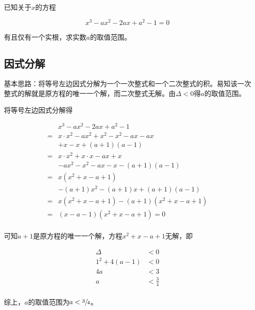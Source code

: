 

已知关于$x$的方程

\[ x^3 - ax^2 - 2ax + a^2 - 1 = 0 \]

有且仅有一个实根，求实数$a$的取值范围。


\subsection{因式分解}

基本思路：将等号左边因式分解为一个一次整式和一个二次整式的积。易知该一次整式的解就是原方程的唯一一个解，而二次整式无解。由$\Delta < 0$得$a$的取值范围。

将等号左边因式分解得

\begin{align*}
  & x^3 - ax^2 - 2ax + a^2 - 1 \\
  =&{} x\cdot x^2 - ax^2 + x^2 - x^2 - ax - ax \\
  &+ x - x + (a + 1)(a - 1) \\
  =&{} x\cdot x^2 + x\cdot x - ax + x \\
  &- ax^2 - x^2 - ax - x - (a + 1)(a - 1) \\
  =&{} x(x^2 + x - a + 1) \\
  &- (a + 1)x^2 - (a + 1)x + (a + 1)(a - 1) \\
  =&{} x(x^2 + x - a + 1) - (a + 1)(x^2 + x - a + 1) \\
  =&{} (x - a - 1)(x^2 + x - a + 1) = 0 \\
\end{align*}

可知$a + 1$是原方程的唯一一个解，方程$x^2 + x - a + 1$无解，即

\begin{align*}
  \Delta &< 0 \\
  1^2 + 4(a - 1) &< 0 \\
  4a &< 3 \\
  a &< \frac34 \\
\end{align*}

综上，$a$的取值范围为$a < \sfrac34$。
